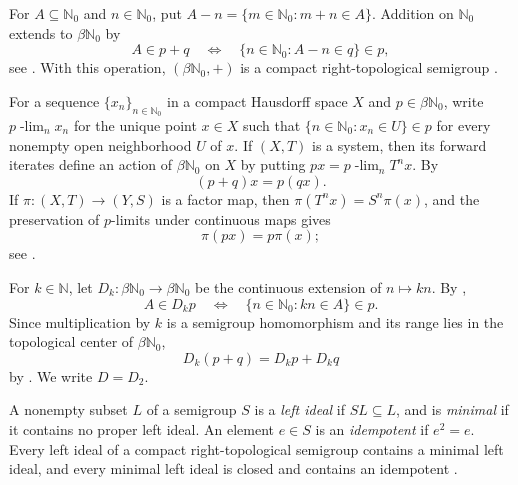 \documentclass[reqno,12pt]{amsart}
\newcommand{\Nzero}{\mathbb N_0}
\newcommand{\bN}{\beta\Nzero}
\def \N {\mathbb N}
\numberwithin{equation}{section}
\begin{document}
For $A\subseteq\Nzero$ and $n\in\Nzero$, put
$A-n=\{m\in\Nzero:m+n\in A\}$.  Addition on $\Nzero$ extends to $\bN$
by
\begin{equation}\label{eq:beta-add}
A\in p+q
\quad\Longleftrightarrow\quad
\{n\in\Nzero:A-n\in q\}\in p,
\end{equation}
see \cite[Theorem~4.12(b)]{HS}. With this operation, $(\bN,+)$ is a compact right-topological semigroup \cite[Theorems~3.28, 4.1, and 4.4]{HS}.

For a sequence $\{x_n\}_{n\in \Nzero}$ in a compact Hausdorff space $X$ and
$p\in\bN$, write $p\!\operatorname{-lim}_n x_n$ for the unique point
$x\in X$ such that
$\{n\in \Nzero:x_n\in U\}\in p$ for every nonempty open neighborhood $U$ of $x$. If $(X,T)$ is a
system, then its forward iterates define an action of $\beta\Nzero$ on
$X$ by putting
$
px=p\!\operatorname{-lim}_{n}T^n x.
$
By \cite[Theorem~19.11 and Remark~19.13]{HS}
\begin{equation}\label{eq:action}
(p+q)x=p(qx).
\end{equation}
If $\pi:(X,T)\to(Y,S)$ is a factor map, then
$\pi(T^n x)=S^n\pi(x)$, and the preservation of $p$-limits under
continuous maps gives
\begin{equation}\label{eq:factor-action}
   \pi(px)=p\pi(x);
\end{equation}
see \cite[Theorem~3.49]{HS}.

For $k\in\N$, let $D_k:\bN\to\bN$ be the continuous extension of
$n\mapsto kn$. By \cite[Lemma~3.30]{HS},
\begin{equation}\label{eq:Dk-member}
A\in D_kp
\quad\Longleftrightarrow\quad
\{n\in\Nzero:kn\in A\}\in p.
\end{equation}
Since multiplication by $k$ is a semigroup homomorphism and its range lies
in the topological center of $\bN$,
\begin{equation}\label{eq:Dk-hom}
   D_k(p+q)=D_kp+D_kq
\end{equation}
by \cite[Corollary~4.22]{HS}. We write $D=D_2$.

A nonempty subset $L$ of a semigroup $S$ is a \emph{left ideal} if
$SL\subseteq L$, and is \emph{minimal} if it contains no proper left
ideal.  An element $e\in S$ is an \emph{idempotent} if $e^2=e$.  Every
left ideal of a compact right-topological semigroup contains a minimal
left ideal, and every minimal left ideal is closed and contains an
idempotent \cite[Corollary~2.6]{HS}.
\end{document}
